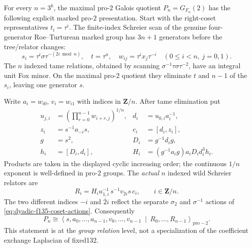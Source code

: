 \begin{theorem}
\label{thm:dyadic-f135-marked-schreier-tower}
For every $n=3^k$,
the maximal pro-$2$ Galois quotient
$P_n=G_{F_n}(2)$ has the following
explicit marked pro-$2$ presentation.
Start with the right-coset
representatives $t_i=\tau^i$.
The finite-index Schreier scan of
the genuine four-generator
Roe--Turturean marked group
has $3n+1$ generators before
the tree/relator changes:
\[
s_i=\tau^i\sigma
  \tau^{-(2i\bmod n)},\quad
t=\tau^n,\quad
w_{ij}=\tau^ix_j\tau^{-i}
\quad (0\le i<n,\ j=0,1).
\]
The $n$ indexed tame relations,
obtained by scanning
$\sigma^{-1}\tau\sigma\tau^{-2}$,
have an integral unit Fox minor.
On the maximal pro-$2$ quotient
they eliminate
$t$ and $n-1$ of the $s_i$,
leaving one generator $s$.

Write $a_i=w_{i0}$, $v_i=w_{i1}$
with indices in $\mathbf Z/n$.
After tame elimination put
\begin{equation}\label{eq:dyadic-f135-indexed-wild-packets}
\boxed{
\begin{aligned}
u_{j,i}&=
\left(\prod_{r=0}^{n-1}
 w_{i+r,j}\right)^{1/n},
&
d_i&=u_{0,i}a_i^{-1},
\\
z_i&=s^{-1}a_{-i}s,
&
c_i&=[d_i,z_i],
\\
g&=s^2,
&
D_i&=g^{-1}d_i g,
\\
h_i&=[D_i,d_i],
&
H_i&=(g^{-1}a_i g)a_iD_i d_i^3h_i .
\end{aligned}}
\end{equation}
Products are taken in the displayed
cyclic increasing order; the
continuous $1/n$ exponent is
well-defined in pro-$2$ groups.
The \emph{actual} $n$ indexed wild
Schreier relators are
\begin{equation}\label{eq:dyadic-f135-indexed-wild-relators}
\boxed{\qquad
R_i=H_i u_{1,i}^{-1}
\,s^{-1}v_{\overline2 i}s\,c_i,
\qquad i\in\mathbf Z/n.
\qquad}
\end{equation}
The two different indices $-i$ and
$\overline2i$ reflect the separate
$\sigma_2$ and $\sigma^{-1}$
actions of \eqref{eq:dyadic-f135-coset-actions}.
Consequently
\begin{equation}\label{eq:dyadic-f135-tower-n-two-n-relators}
\boxed{\quad
P_n\cong
\left\langle
s,a_0,\ldots,a_{n-1},
v_0,\ldots,v_{n-1}
\ \middle|\
R_0,\ldots,R_{n-1}
\right\rangle_{\mathrm{pro}-2}.
\quad}
\end{equation}
This statement is at the \emph{group
relation} level, not a specialization
of the coefficient exchange Laplacian
of fixed132.
\end{theorem}

